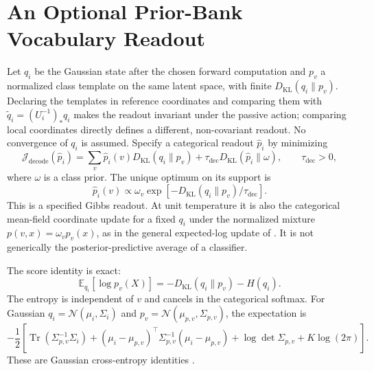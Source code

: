 \documentclass[twoside,11pt]{article}
\begin{document}
\section{An Optional Prior-Bank Vocabulary Readout}
\label{sec:prior_bank_readout}

Let $q_i$ be the Gaussian state after the chosen forward computation and $p_v$ a normalized class template on the same latent space, with finite $D_{\mathrm{KL}}(q_i\|p_v)$. Declaring the templates in reference coordinates and comparing them with $\widetilde q_i=(U_i^{-1})_*q_i$ makes the readout invariant under the passive action; comparing local coordinates directly defines a different, non-covariant readout. No convergence of $q_i$ is assumed. Specify a categorical readout $\hat p_i$ by minimizing
\begin{equation}
\mathcal J_{\mathrm{decode}}(\hat p_i)
=\sum_v\hat p_i(v)D_{\mathrm{KL}}(q_i\|p_v)
+\tau_{\mathrm{dec}}D_{\mathrm{KL}}(\hat p_i\|\omega),
\qquad\tau_{\mathrm{dec}}>0,
\end{equation}
where $\omega$ is a class prior. The unique optimum on its support is
\begin{equation}
\hat p_i(v)\propto\omega_v\exp\left[-D_{\mathrm{KL}}(q_i\|p_v)/\tau_{\mathrm{dec}}\right].
\label{eq:readout_gibbs}
\end{equation}
This is a specified Gibbs readout. At unit temperature it is also the categorical mean-field coordinate update for a fixed $q_i$ under the normalized mixture $p(v,x)=\omega_vp_v(x)$, as in the general expected-log update of \citet[\S2.4, Eqs.~17--18]{Blei2017}. It is not generically the posterior-predictive average of a classifier.

The score identity is exact:
\begin{equation}
\mathbb E_{q_i}[\log p_v(X)]
=-D_{\mathrm{KL}}(q_i\|p_v)-H(q_i).
\label{eq:readout_kl_decomposition}
\end{equation}
The entropy is independent of $v$ and cancels in the categorical softmax. For Gaussian $q_i=\mathcal N(\mu_i,\Sigma_i)$ and $p_v=\mathcal N(\mu_{p,v},\Sigma_{p,v})$, the expectation is
\begin{equation}
-\frac12\left[
\operatorname{Tr}(\Sigma_{p,v}^{-1}\Sigma_i)
+(\mu_i-\mu_{p,v})^\top\Sigma_{p,v}^{-1}(\mu_i-\mu_{p,v})
+\log\det\Sigma_{p,v}+K\log(2\pi)
\right].
\label{eq:readout_expected_loglik}
\end{equation}
These are Gaussian cross-entropy identities \citep{Bishop2006}.
\end{document}
